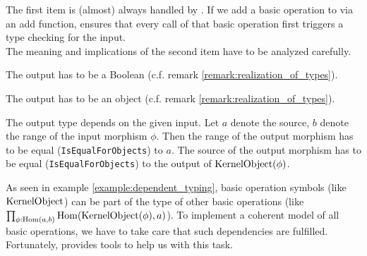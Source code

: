 The first item is (almost) always handled by \CapPkg.
If we add a basic operation to \CapPkg via an add function, \CapPkg ensures that every call of that
basic operation first triggers a type checking for the input.
\\
The meaning and implications of the second item have to be analyzed carefully.
\begin{example}
 The output has to be a Boolean (c.f. remark \ref{remark:realization_of_types}).
\end{example}

\begin{example}
 The output has to be an object (c.f. remark \ref{remark:realization_of_types}).
\end{example}

\begin{example}[\ref{example:dependent_typing}]
 The output type depends on the given input. Let $a$ denote the source, $b$ denote the range of the input morphism $\phi$.
 Then the range of the output morphism has to be equal (\texttt{IsEqualForObjects}) to $a$.
 The source of the output morphism has to be equal (\texttt{IsEqualForObjects}) to the output of $\mathrm{KernelObject}(\phi)$.
\end{example}

As seen in example \ref{example:dependent_typing}, basic operation symbols (like $\mathrm{KernelObject}$) can be part of
the type of other basic operations (like $\prod_{\phi: \operatorname{\mathrm{Hom}}(a,b)} \operatorname{\mathrm{Hom}}( \mathrm{KernelObject}(\phi), a )$).
To implement a coherent model of all basic operations, we have to take care that such dependencies are fulfilled.
Fortunately, \CapPkg provides tools to help us with this task.

